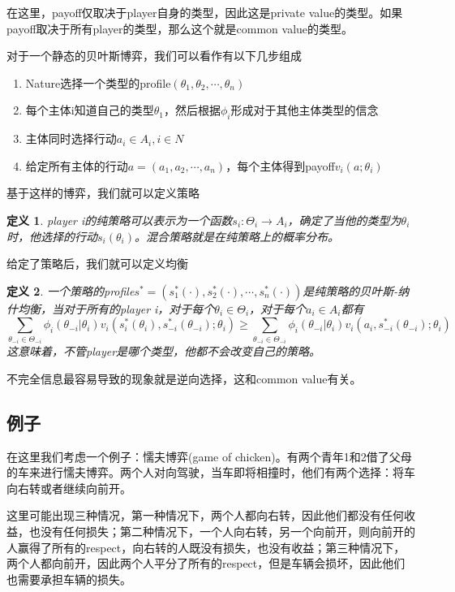 \documentclass[UTF8,12pt]{ctexart}
\newtheorem{Def}{定义}[section]
\numberwithin{equation}{section} %
\numberwithin{figure}{section}
\numberwithin{table}{section}
\begin{document}
	在这里，payoff仅取决于player自身的类型，因此这是private value的类型。如果payoff取决于所有player的类型，那么这个就是common value的类型。
	
	对于一个静态的贝叶斯博弈，我们可以看作有以下几步组成
	\begin{enumerate}
		\item Nature选择一个类型的profile$(\theta_1,\theta_2,\cdots,\theta_n)$
		
		\item 每个主体i知道自己的类型$\theta_1$，然后根据$\phi_i$形成对于其他主体类型的信念
		
		\item 主体同时选择行动$a_i \in A_i,i \in N$
		
		\item 给定所有主体的行动$a = (a_1,a_2,\cdots,a_n)$，每个主体得到payoff$v_i(a;\theta_i)$
	\end{enumerate}
	
	基于这样的博弈，我们就可以定义策略
	\begin{Def}
		player i的纯策略可以表示为一个函数$s_i:\Theta_i \rightarrow A_i$，确定了当他的类型为$\theta_i$时，他选择的行动$s_i(\theta_i)$。混合策略就是在纯策略上的概率分布。
	\end{Def}
	
	给定了策略后，我们就可以定义均衡
	\begin{Def}
		一个策略的profile$s^* = (s^*_1(\cdot),s^*_2(\cdot),\cdots,s^*_n(\cdot))$是纯策略的贝叶斯-纳什均衡，当对于所有的player i，对于每个$\theta_i \in \Theta_i$，对于每个$a_i \in A_i$都有
		\begin{equation}
			\sum_{\theta_{-i} \in \Theta_{-i}}\phi_i(\theta_{-i}|\theta_i)v_i(s^*_i(\theta_i),s^*_{-i}(\theta_{-i});\theta_i)
			\geqslant
			\sum_{\theta_{-i} \in \Theta_{-i}}\phi_i(\theta_{-i}|\theta_i)v_i(a_i,s^*_{-i}(\theta_{-i});\theta_i)
		\end{equation}
		这意味着，不管player是哪个类型，他都不会改变自己的策略。
	\end{Def}
	
	不完全信息最容易导致的现象就是逆向选择，这和common value有关。
	
	\subsection{例子}
	在这里我们考虑一个例子：懦夫博弈(game of chicken)。有两个青年1和2借了父母的车来进行懦夫博弈。两个人对向驾驶，当车即将相撞时，他们有两个选择：将车向右转或者继续向前开。
	
	这里可能出现三种情况，第一种情况下，两个人都向右转，因此他们都没有任何收益，也没有任何损失；第二种情况下，一个人向右转，另一个向前开，则向前开的人赢得了所有的respect，向右转的人既没有损失，也没有收益；第三种情况下，两个人都向前开，因此两个人平分了所有的respect，但是车辆会损坏，因此他们也需要承担车辆的损失。
	
\end{document}
